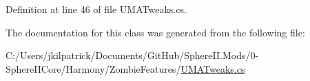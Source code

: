 Definition at line 46 of file U\+M\+A\+Tweaks.\+cs.



The documentation for this class was generated from the following file\+:\begin{DoxyCompactItemize}
\item 
C\+:/\+Users/jkilpatrick/\+Documents/\+Git\+Hub/\+Sphere\+I\+I.\+Mods/0-\/\+Sphere\+I\+I\+Core/\+Harmony/\+Zombie\+Features/\mbox{\hyperlink{_u_m_a_tweaks_8cs}{U\+M\+A\+Tweaks.\+cs}}\end{DoxyCompactItemize}
